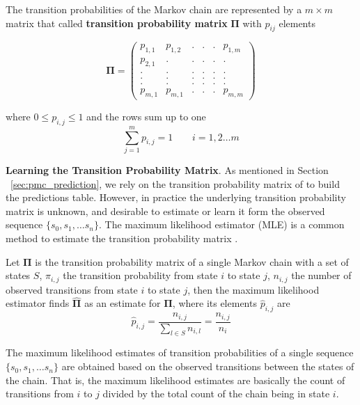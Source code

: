 The transition probabilities of the Markov chain are represented by a $m \times m$ matrix that called \textbf{transition probability matrix} $\boldsymbol{\Pi}$ with $p_{ij}$ elements


\begin{equation}
\label{eq:matrix_example}
\boldsymbol{\Pi} = 
\begin{pmatrix} 
p_{1,1}	   &p_{1,2}  &. 		&. 		& . &  	p_{1,m} \\
p_{2,1}		   &.  & .		& .	    & .	& . \\
. 		   &.  & .		& .	    & .	& . \\
.		   &.  & .		& .		& .	& . \\
.		   &.  & .		& .		& .	& .\\
p_{m,1}	   & p_{m,1}	&.		& .	& .	&p_{m,m}
\end{pmatrix}
\end{equation}

where $0 \leq p_{i,j}\leq 1 $ and the rows sum up to one 
\begin{equation}
\sum_{j=1}^{m} p_{i,j}= 1\ \ \ \ \ \ \ \ \ i=1,2 \ldots m
\end{equation}

\textbf{Learning the Transition Probability Matrix}. As mentioned in Section ~\ref{sec:pmc_prediction}, we rely on the transition probability matrix of \pmcmr to build the predictions table. However, in practice the underlying  transition probability matrix is unknown, and desirable to estimate or learn it form the observed sequence $\{s_0, s_1, \ldots s_n\}$. The maximum likelihood estimator (MLE) is a common method to estimate the transition probability matrix \cite{anderson1957statistical}.


\begin{definition}
	Let $\boldsymbol{\Pi}$ is the transition probability matrix of a single Markov chain with a set of states $S$, 
	$\pi_{i,j}$ the transition probability from state $i$ to state $j$,
	$n_{i,j}$ the number of observed transitions from state $i$ to state $j$,
	then the maximum likelihood estimator finds $\boldsymbol{\hat{\Pi}}$ as an estimate for $\boldsymbol{\Pi}$, where its elements $\hat{p}_{i,j}$ are
	\begin{equation}
	\label{eq:pi_estim}
	\hat{p}_{i,j}=\frac{n_{i,j}}{\sum_{l \in S} n_{i,l}}=\frac{n_{i,j}}{n_{i}}
	\end{equation}
	
\end{definition} 


	The maximum likelihood estimates of transition probabilities of a single sequence $\{s_0, s_1, \ldots s_n\}$   are obtained based on the observed transitions between the states of the chain. That is, the maximum likelihood estimates are basically the count of transitions from $i$ to $j$ divided by the total count of the chain being in state $i$.  
	
